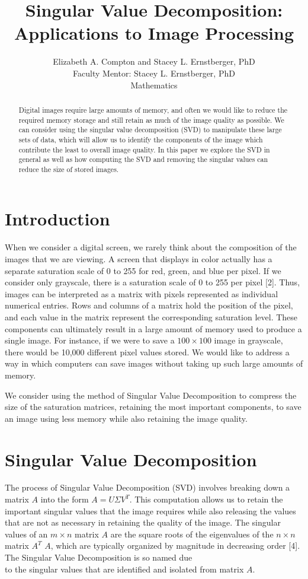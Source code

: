 \documentclass[10pt]{article}
\title{Singular Value Decomposition: Applications to Image Processing }
\author{Elizabeth A. Compton and Stacey L. Ernstberger, PhD\\
Faculty Mentor: Stacey L. Ernstberger, PhD\\
Mathematics}
\date{}
\begin{document}
\maketitle


\begin{abstract}
Digital images require large amounts of memory, and often we would like to reduce the required memory storage and still retain as much of the image quality as possible. We can consider using the singular value decomposition (SVD) to manipulate these large sets of data, which will allow us to identify the components of the image which contribute the least to overall image quality. In this paper we explore the SVD in general as well as how computing the SVD and removing the singular values can reduce the size of stored images.
\end{abstract}

\section*{Introduction}
When we consider a digital screen, we rarely think about the composition of the images that we are viewing. A screen that displays in color actually has a separate saturation scale of 0 to 255 for red, green, and blue per pixel. If we consider only grayscale, there is a saturation scale of 0 to 255 per pixel [2]. Thus, images can be interpreted as a matrix with pixels represented as individual numerical entries. Rows and columns of a matrix hold the position of the pixel, and each value in the matrix represent the corresponding saturation level. These components can ultimately result in a large amount of memory used to produce a single image. For instance, if we were to save a $100 \times 100$ image in grayscale, there would be 10,000 different pixel values stored. We would like to address a way in which computers can save images without taking up such large amounts of memory.

We consider using the method of Singular Value Decomposition to compress the size of the saturation matrices, retaining the most important components, to save an image using less memory while also retaining the image quality.

\section*{Singular Value Decomposition}
The process of Singular Value Decomposition (SVD) involves breaking down a matrix $A$ into the form $A=U \Sigma V^{T}$. This computation allows us to retain the important singular values that the image requires while also releasing the values that are not as necessary in retaining the quality of the image. The singular values of an $m \times n$ matrix $A$ are the square roots of the eigenvalues of the $n \times n$ matrix $A^{T}$ $A$, which are typically organized by magnitude in decreasing order [4]. The Singular Value Decomposition is so named due\\
to the singular values that are identified and isolated from matrix $A$.
\end{document}
